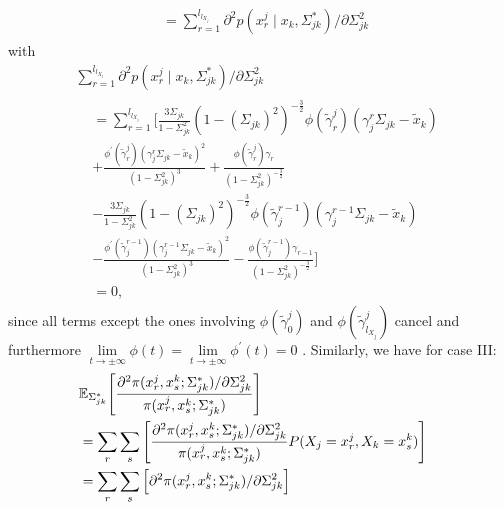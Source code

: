 \begin{condition}
\begin{condition}
\begin{multline*}
\begin{aligned}
                &= \sum_{r=1}^{l_{l_{X_j}}} \partial^2 p(x^j_{r} \mid x_{k}, \Sigma_{jk}^*)/\partial \Sigma_{jk}^{2}
                \end{aligned}
        \end{multline*}
        with 
        \begin{multline*}
                \sum_{r=1}^{l_{l_{X_j}}} \partial^2 p(x^j_{r} \mid x_{k}, \Sigma_{jk}^*)/\partial \Sigma_{jk}^{2}\\
                \begin{aligned}
                &=\sum_{r=1}^{l_{l_{X_j}}} \Bigg[ \frac{3\Sigma_{jk}}{1-\Sigma_{jk}^2} (1-(\Sigma_{jk})^2)^{-\frac{3}{2}} \phi({\tilde{\gamma}}^j_{r})({\gamma}_j^r\Sigma_{jk} - {\tilde{x}}_{k}) \\
                &+ \frac{\phi^\prime({\tilde{\gamma}}^j_{r})({\gamma}_j^r\Sigma_{jk} - {\tilde{x}}_{k})^2}{(1-\Sigma_{jk}^2)^3} + \frac{\phi({\tilde{\gamma}}^j_{r}){\gamma}_{r}}{(1-\Sigma_{jk}^2)^{-\frac{3}{2}}} \\
                &- \frac{3\Sigma_{jk}}{1-\Sigma_{jk}^2} (1-(\Sigma_{jk})^2)^{-\frac{3}{2}} \phi({\tilde{\gamma}}_j^{r-1})({\gamma}_j^{r-1}\Sigma_{jk} - {\tilde{x}}_{k}) \\
                &- \frac{\phi^\prime({\tilde{\gamma}}_j^{r-1})({\gamma}_j^{r-1}\Sigma_{jk} - {\tilde{x}}_{k})^2}{(1-\Sigma_{jk}^2)^3} - \frac{\phi({\tilde{\gamma}}_j^{r-1}){\gamma}_{r-1}}{(1-\Sigma_{jk}^2)^{-\frac{3}{2}}}\Bigg] \\
                &= 0,
                \end{aligned}
        \end{multline*}
        since all terms except the ones involving $\phi({\tilde{\gamma}}^j_{0})$ and $\phi({\tilde{\gamma}}^j_{l_{X_j}})$ cancel and furthermore $ \lim\limits_{t \to \pm \infty} \phi(t) = \lim\limits_{t \to \pm \infty} \phi^\prime(t) = 0$ . Similarly, we have for case III:
        \begin{equation*}
            \begin{split}
                \lefteqn{\mathbb{E}_{\Sigma_{jk}^*}\Bigg[\frac{\partial^2 \pi(x^j_{r},x^k_{s}; \Sigma_{jk}^*)/\partial \Sigma_{jk}^{2}}{\pi(x^j_{r},x^k_{s}; \Sigma_{jk}^*)}\Bigg]} \\
                &= \sum_r \sum_s \Bigg[\frac{\partial^2 \pi(x^j_{r},x^k_{s}; \Sigma_{jk}^*)/\partial \Sigma_{jk}^{2}}{\pi(x^j_{r},x^k_{s}; \Sigma_{jk}^*)} P(X_j = x_r^j, X_k = x_s^k)\Bigg] \\
                &= \sum_r\sum_s \Big[\partial^2 \pi(x^j_{r},x^k_{s}; \Sigma_{jk}^*)/\partial \Sigma_{jk}^{2}\Big] \\

\end{split}
\end{equation*}
\end{condition}
\end{condition}
